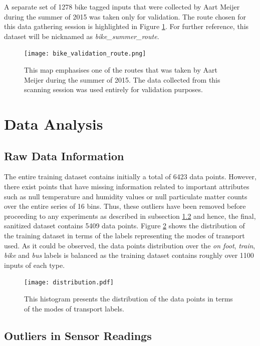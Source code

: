 \documentclass[bsc,frontabs,twoside,singlespacing, parskip,deptreport]{infthesis}     %
\begin{document}
A separate set of 1278 bike tagged inputs that were collected by Aart Meijer during the summer of 2015 was taken only for validation. The route chosen for this data gathering session is highlighted in Figure \ref{fig:bike-validation-route}. For further reference, this dataset will be nicknamed as \textit{bike\_summer\_route}.

\begin{figure}[h!]
  \center
  \texttt{[image: bike\_validation\_route.png]} 
  \caption{This map emphasises one of the routes that was taken by Aart Meijer during the summer of 2015. The data collected from this scanning session was used entirely for validation purposes.}
  \label{fig:bike-validation-route}
\end{figure}

\section{Data Analysis}
\label{sec:data-analysis}

\subsection{Raw Data Information}

The entire training dataset contains initially a total of 6423 data points. However, there exist points that have missing information related to important attributes such as null temperature and humidity values or null particulate matter counts over the entire series of 16 bins. Thus, these outliers have been removed before proceeding to any experiments as described in subsection \ref{subsec:outlier-removal} and hence, the final, sanitized dataset contains 5409 data points. Figure \ref{fig:distribution} shows the distribution of the training dataset in terms of the labels representing the modes of transport used. As it could be observed, the data points distribution over the \textit{on foot}, \textit{train}, \textit{bike} and \textit{bus} labels is balanced as the training dataset contains roughly over 1100 inputs of each type.

\begin{figure}[h!]
  \center
  \texttt{[image: distribution.pdf]}
  \caption{This histogram presents the distribution of the data points in terms of the modes of transport labels.}
  \label{fig:distribution}
\end{figure}


\subsection{Outliers in Sensor Readings}
\label{subsec:outlier-removal}
\end{document}
